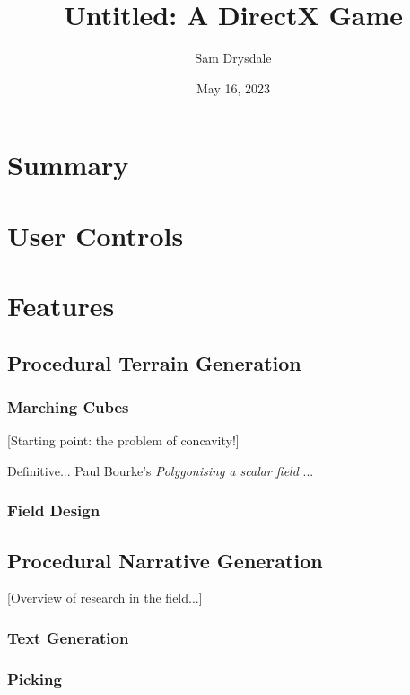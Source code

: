 \documentclass[a4paper, 11pt]{article}
\title{Untitled: A DirectX Game}
\author{Sam Drysdale}
\date{May 16, 2023}
\begin{document}
\graphicspath{{./Images/}}
\maketitle
\tableofcontents
\begin{flushleft}

\section{Summary}


\section{User Controls}


\section{Features}

\subsection{Procedural Terrain Generation}

\subsubsection{Marching Cubes}

[Starting point: the problem of concavity!]

Definitive... Paul Bourke's \textit{Polygonising a scalar field} \citeyearpar{bourkeMarchingCubes}...

\subsubsection{Field Design}

\subsection{Procedural Narrative Generation}

[Overview of research in the field...]

\subsubsection{Text Generation}

\subsubsection{Picking}


\end{flushleft}
\end{document}
